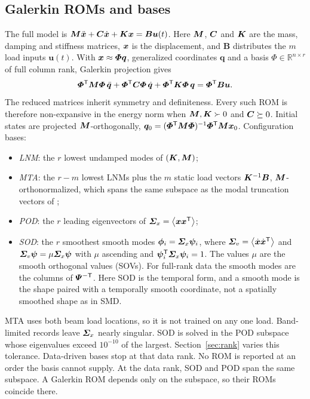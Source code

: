\documentclass[preprint,12pt]{elsarticle}
\begin{document}
\subsection{Galerkin ROMs and bases}
The full model is $\bm{M}\ddot{\bm{x}}+\bm{C}\dot{\bm{x}}+\bm{K}\bm{x}=\bm{B}\bm{u}(t)$. Here $\bm{M}$, $\bm{C}$ and $\bm{K}$ are the mass, damping and stiffness matrices, $\bm{x}$ is the displacement, and $\bm{B}$ distributes the $m$ load inputs $\bm{u}(t)$.
With $\bm{x}\approx\bm{\varPhi}\bm{q}$, generalized coordinates $\bm{q}$ and a basis $\bm{\varPhi}\in\mathbb{R}^{n\times r}$ of full column rank, Galerkin projection gives
\begin{equation}
\bm{\varPhi}^{\mathsf T}\bm{M}\bm{\varPhi}\,\ddot{\bm{q}}+\bm{\varPhi}^{\mathsf T}\bm{C}\bm{\varPhi}\,\dot{\bm{q}}+\bm{\varPhi}^{\mathsf T}\bm{K}\bm{\varPhi}\,\bm{q}=\bm{\varPhi}^{\mathsf T}\bm{B}\bm{u}.
\label{eq:rom}
\end{equation}
The reduced matrices inherit symmetry and definiteness. Every such ROM is therefore non-expansive in the energy norm when $\bm{M},\bm{K}\succ0$ and $\bm{C}\succeq0$.
Initial states are projected $\bm{M}$-orthogonally, $\bm{q}_0=(\bm{\varPhi}^{\mathsf T}\bm{M}\bm{\varPhi})^{-1}\bm{\varPhi}^{\mathsf T}\bm{M}\bm{x}_0$.
Configuration bases:
\begin{itemize}
\item \emph{LNM}: the $r$ lowest undamped modes of $(\bm{K},\bm{M})$;
\item \emph{MTA}: the $r-m$ lowest LNMs plus the $m$ static load vectors $\bm{K}^{-1}\bm{B}$, $\bm{M}$-orthonormalized, which spans the same subspace as the modal truncation vectors of \citet{Dickens1997};
\item \emph{POD}: the $r$ leading eigenvectors of $\bm{\varSigma}_x=\left\langle \bm{x}\bm{x}^{\mathsf T} \right\rangle$;
\item \emph{SOD}: the $r$ smoothest smooth modes $\bm{\phi}_i=\bm{\varSigma}_x\bm{\psi}_i$, where $\bm{\varSigma}_v=\left\langle \dot{\bm{x}}\dot{\bm{x}}^{\mathsf T} \right\rangle$ and $\bm{\varSigma}_v\bm{\psi}=\mu\bm{\varSigma}_x\bm{\psi}$ with $\mu$ ascending and $\bm{\psi}_i^{\mathsf T}\bm{\varSigma}_x\bm{\psi}_i=1$. The values $\mu$ are the smooth orthogonal values (SOVs). For full-rank data the smooth modes are the columns of $\bm{\varPsi}^{-\mathsf T}$. Here SOD is the temporal form, and a smooth mode is the shape paired with a temporally smooth coordinate, not a spatially smoothed shape as in SMD.
\end{itemize}
MTA uses both beam load locations, so it is not trained on any one load.
Band-limited records leave $\bm{\varSigma}_x$ nearly singular. SOD is solved in the POD subspace whose eigenvalues exceed $10^{-10}$ of the largest. Section~\ref{sec:rank} varies this tolerance.
Data-driven bases stop at that data rank. No ROM is reported at an order the basis cannot supply.
At the data rank, SOD and POD span the same subspace. A Galerkin ROM depends only on the subspace, so their ROMs coincide there.
\end{document}
